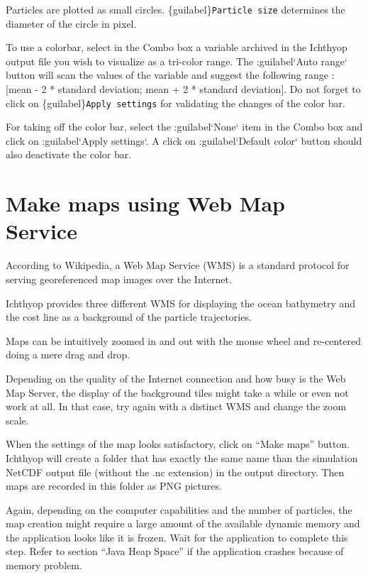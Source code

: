 \documentclass[
  letterpaper,
  DIV=11,
  numbers=noendperiod]{scrreprt}
\begin{document}
Particles are plotted as small circles.
\{guilabel\}\texttt{Particle\ size} determines the diameter of the
circle in pixel.

To use a colorbar, select in the Combo box a variable archived in the
Ichthyop output file you wish to visualize as a tri-color range. The
:guilabel`Auto range` button will scan the values of the variable and
suggest the following range : {[}mean - 2 * standard deviation; mean + 2
* standard deviation{]}. Do not forget to click on
\{guilabel\}\texttt{Apply\ settings} for validating the changes of the
color bar.

For taking off the color bar, select the :guilabel`None` item in the
Combo box and click on :guilabel`Apply settings`. A click on
:guilabel`Default color` button should also deactivate the color bar.

\section{Make maps using Web Map
Service}\label{make-maps-using-web-map-service}

According to Wikipedia, a Web Map Service (WMS) is a standard protocol
for serving georeferenced map images over the Internet.

Ichthyop provides three different WMS for displaying the ocean
bathymetry and the cost line as a background of the particle
trajectories.

Maps can be intuitively zoomed in and out with the mouse wheel and
re-centered doing a mere drag and drop.

Depending on the quality of the Internet connection and how busy is the
Web Map Server, the display of the background tiles might take a while
or even not work at all. In that case, try again with a distinct WMS and
change the zoom scale.

When the settings of the map looks satisfactory, click on ``Make maps''
button. Ichthyop will create a folder that has exactly the same name
than the simulation NetCDF output file (without the .nc extension) in
the output directory. Then maps are recorded in this folder as PNG
pictures.

Again, depending on the computer capabilities and the number of
particles, the map creation might require a large amount of the
available dynamic memory and the application looks like it is frozen.
Wait for the application to complete this step. Refer to section ``Java
Heap Space'' if the application crashes because of memory problem.
\end{document}
